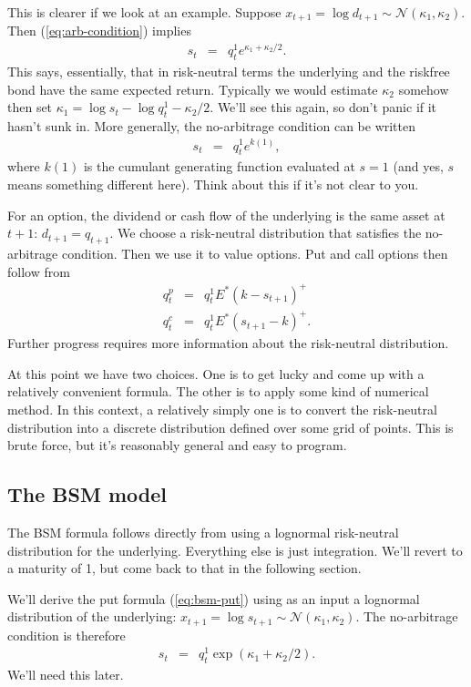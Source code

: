\documentclass[11pt]{article}
\begin{document}
This is clearer if we look at an example.
Suppose $x_{t+1} = \log d_{t+1} \sim \mathcal{N} (\kappa_1,\kappa_2)$.
Then (\ref{eq:arb-condition}) implies
\begin{eqnarray*}
    s_t &=& q^1_t e^{\kappa_1 + \kappa_2/2}.
\end{eqnarray*}
This says, essentially, that in risk-neutral terms
the underlying and the riskfree bond have the same expected return.
Typically we would estimate $\kappa_2$ somehow
then set $\kappa_1 = \log s_t -\log q_t^1 - \kappa_2/2$.
We'll see this again, so don't panic if it hasn't sunk in.
More generally, the no-arbitrage condition can be written
\begin{eqnarray*}
    s_t &=& q^1_t e^{k(1)},
\end{eqnarray*}
where $k(1)$ is the cumulant generating function evaluated at $s=1$
(and yes, $s$ means something different here).
Think about this if it's not clear to you.


For an option, the dividend or cash flow of the underlying is
the same asset at $t+1$:
$ d_{t+1} = q_{t+1}$.
We choose a risk-neutral distribution that satisfies the no-arbitrage condition.
Then we use it to value options.
Put and call options then follow from
\begin{eqnarray*}
        q^p_t &=&  q_t^1 E^* (k-s_{t+1})^+  \\
        q^c_t &=&  q_t^1 E^* (s_{t+1}-k)^+ .
\end{eqnarray*}
Further progress requires more information about the risk-neutral distribution.

At this point we have two choices.
One is to get lucky and come up with a relatively convenient formula.
The other is to apply some kind of numerical method.
In this context, a relatively simply one is to convert the
risk-neutral distribution into a discrete distribution defined
over some grid of points.
This is brute force, but it's reasonably general and easy to program.


\subsection*{The BSM model}


The BSM formula follows directly from using a lognormal risk-neutral distribution
for the underlying.  Everything else is just integration.
We'll revert to a maturity of 1, but come back to that in the following section.

We'll derive the put formula (\ref{eq:bsm-put})
using as an input a lognormal distribution
of the underlying:
$x_{t+1} = \log s_{t+1} \sim \mathcal{N} (\kappa_1,\kappa_2)$.
The no-arbitrage condition is therefore
\begin{eqnarray}
    s_t &=& q_t^1 \exp(\kappa_1 + \kappa_2/2 ) .
    \label{eq:bsm-no-arb}
\end{eqnarray}
We'll need this later.
\end{document}
